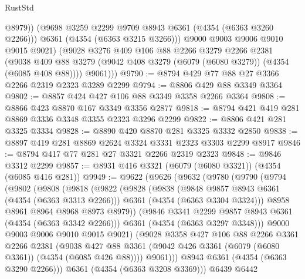 \begin{lexlean}{RustStd}
\begin{coremodule}
                @8979))
            (@9698 @3259 @2299 @9709 @8943 @6361 (@4354 (@6363 @3260 @2266)))
            @6361
            (@4354 (@6363 @3215 @3266)))
          @9000
          @9003
          @9006
          @9010
          @9015
          @9021)
        (@9028
          @3276
          @409
          @106
          @88
          @2266
          @3279
          @2266
          @2381
          (@9038 @409 @88 @3279 (@9042 @408 @3279 (@6079 (@6080 @3279)) (@4354 (@6085 @408 @88))))
          @9061)))
@9790 := @8794 @429 @77 @88 @27 @3366 @2266 @2319 @2323 @3289 @2299
@9794 := @8806 @429 @88 @3349 @3364
@9802 := @8857 @424 @427 @106 @88 @3349 @3358 @2266 @3364
@9808 := @8866 @423 @8870 @167 @3349 @3356 @2877
@9818 := @8794 @421 @419 @281 @8869 @3336 @3348 @3355 @2323 @3296 @2299
@9822 := @8806 @421 @281 @3325 @3334
@9828 := @8890 @420 @8870 @281 @3325 @3332 @2850
@9838 := @8897 @419 @281 @8869 @2624 @3324 @3331 @2323 @3303 @2299 @8917
@9846 := @8794 @417 @77 @281 @27 @3321 @2266 @2319 @2323
@9848 := @9846 @3312 @2299
@9857 := @8931 @416 @3321 (@6079 (@6080 @3321)) (@4354 (@6085 @416 @281))
@9949 := @9622
    (@9626
      (@9632
        (@9780
          (@9790
            (@9794
              (@9802
                (@9808
                  (@9818
                    (@9822
                      (@9828
                        (@9838
                          (@9848 @9857 @8943 @6361 (@4354 (@6363 @3313 @2266)))
                          @6361
                          (@4354 (@6363 @3304 @3324)))
                        @8958
                        @8961
                        @8964
                        @8968
                        @8973
                        @8979))
                    (@9846 @3341 @2299 @9857 @8943 @6361 (@4354 (@6363 @3342 @2266)))
                    @6361
                    (@4354 (@6363 @3297 @3348)))
                  @9000
                  @9003
                  @9006
                  @9010
                  @9015
                  @9021)
                (@9028
                  @3358
                  @427
                  @106
                  @88
                  @2266
                  @3361
                  @2266
                  @2381
                  (@9038
                    @427
                    @88
                    @3361
                    (@9042 @426 @3361 (@6079 (@6080 @3361)) (@4354 (@6085 @426 @88))))
                  @9061)))
            @8943
            @6361
            (@4354 (@6363 @3290 @2266)))
          @6361
          (@4354 (@6363 @3208 @3369)))
        @6439
        @6442

\end{coremodule}
\end{lexlean}
